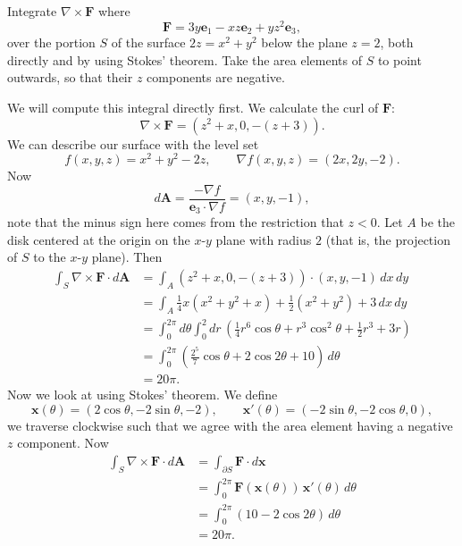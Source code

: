 \setcounter{question}{86}
\question Integrate $\nabla \times \bm F$ where
\[
    \bm F = 3y \bm e_1 - xz\bm e_2 + yz^2 \bm e_3,
\]
over the portion $S$ of the surface 
$2z = x^2 + y^2$ below the plane $z = 2$,
both directly and by using Stokes' theorem.
Take the area elements of $S$ to point outwards, 
so that their $z$ components are negative.
\begin{solution}
    We will compute this integral directly first.
    We calculate the curl of $\bm F$:
    \[
        \nabla \times \bm F = (z^2 + x, 0, -(z+3)).
    \]
    We can describe our surface with the level set
    \[
        f(x,y,z) = x^2 + y^2 - 2z, \qquad \nabla f(x,y,z) = (2x,2y,-2).
    \]
    Now
    \[
        d\bm A 
        = \frac{-\nabla f}{\bm e_3 \cdot \nabla f} 
        = (x,y,-1),
    \]
    note that the minus sign here comes from the restriction that
    $z < 0$.
    Let $A$ be the disk centered at the origin on the $x$-$y$ plane
    with radius $2$
    (that is, the projection of $S$ to the $x$-$y$ plane).
    Then
    \begin{align*}
        \int_S \nabla \times \bm F \cdot d\bm A
        &= \int_A (z^2+x, 0, -(z+3)) \cdot (x,y,-1) \,dx\,dy \\
        &= \int_A \frac14x(x^2 + y^2 + x) + \frac12(x^2 + y^2) + 3 \,dx\,dy \\
        &= \int_0^{2\pi} d\theta \int_0^2 dr \,
            \left(
                \frac14 r^6 \cos\theta + r^3 \cos^2\theta + \frac12r^3 + 3r 
            \right) \\
        &= \int_0^{2\pi}
            \left(
                \frac{2^5}{7} \cos\theta + 2\cos{2\theta} + 10
            \right) \,d\theta \\
        &= 20\pi.
    \end{align*}
    Now we look at using Stokes' theorem.
    We define
    \[
        \bm x(\theta) = (2\cos\theta, -2\sin\theta, -2), 
        \qquad \bm x'(\theta) = (-2\sin\theta, -2\cos\theta, 0),
    \]
    we traverse clockwise such that we agree with the area element
    having a negative $z$ component.
    Now
    \begin{align*}
        \int_S \nabla \times \bm F \cdot d\bm A
        &= \int_{\partial S} \bm F \cdot d\bm x \\
        &= \int_{0}^{2\pi} \bm F(\bm x(\theta)) \, \bm x'(\theta) \,d\theta \\
        &= \int_{0}^{2\pi} (10 - 2\cos2\theta) \,d\theta \\
        &= 20\pi.
    \end{align*}
\end{solution}

